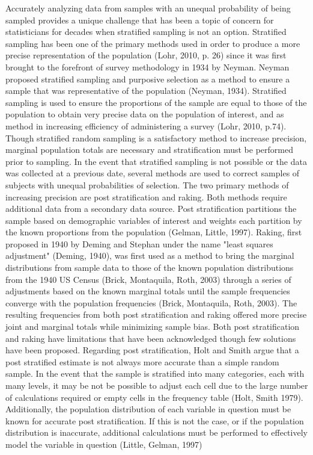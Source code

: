 \documentclass[aoas]{imsart}\usepackage[]{graphicx}\usepackage[]{color}
\begin{document}
Accurately analyzing data from samples with an unequal probability of being sampled provides a unique challenge that has been a topic of concern for statisticians for decades when stratified sampling is not an option. Stratified sampling has been one of the primary methods used in order to produce a more precise representation of the population (Lohr, 2010, p. 26) since it was first brought to the forefront of survey methodology in 1934 by Neyman. Neyman proposed stratified sampling and purposive selection as a method to ensure a sample that was representative of the population (Neyman, 1934). Stratified sampling is used to ensure the proportions of the sample are equal to those of the population to obtain very precise data on the population of interest, and as method in increasing efficiency of administering a survey (Lohr, 2010, p.74). Though stratified random sampling is a satisfactory method to increase precision, marginal population totals are necessary and stratification must be performed prior to sampling. 
	In the event that stratified sampling is not possible or the data was collected at a previous date, several methods are used to correct samples of subjects with unequal probabilities of selection. The two primary methods of increasing precision are post stratification and raking. Both methods require additional data from a secondary data source. Post stratification partitions the sample based on demographic variables of interest and weights each partition by the known proportions from the population (Gelman, Little, 1997).  Raking, first proposed in 1940 by Deming and Stephan under the name "least squares adjustment" (Deming, 1940), was first used as a method to bring the marginal distributions from sample data to those of the known population distributions from the 1940 US Census (Brick, Montaquila, Roth, 2003) through a series of adjustments based on the known marginal totals until the sample frequencies converge with the population frequencies (Brick, Montaquila, Roth, 2003).  The resulting frequencies from both post stratification and raking offered more precise joint and marginal totals while minimizing sample bias. 
	Both post stratification and raking have limitations that have been acknowledged though few solutions have been proposed. Regarding post stratification, Holt and Smith argue that a post stratified estimate is not always more accurate than a simple random sample. In the event that the sample is stratified into many categories, each with many levels, it may be not be possible to adjust each cell due to the large number of calculations required or empty cells in the frequency table (Holt, Smith 1979). Additionally, the population distribution of each variable in question must be known for accurate post stratification. If this is not the case, or if the population distribution is inaccurate, additional calculations must be performed to effectively model the variable in question (Little, Gelman, 1997)
\end{document}
